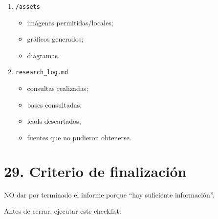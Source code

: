 \documentclass[11pt,a4paper]{article}
\begin{document}
\begin{enumerate}
\item \texttt{/assets}
\begin{itemize}
\item imágenes permitidas/locales;
\item gráficos generados;
\item diagramas.
\end{itemize}
\item \texttt{research\_log.md}
\begin{itemize}
\item consultas realizadas;
\item bases consultadas;
\item leads descartados;
\item fuentes que no pudieron obtenerse.
\end{itemize}
\end{enumerate}


\section*{29. Criterio de finalización}
NO dar por terminado el informe porque ``hay suficiente información''.

Antes de cerrar, ejecutar este checklist:
\end{document}
